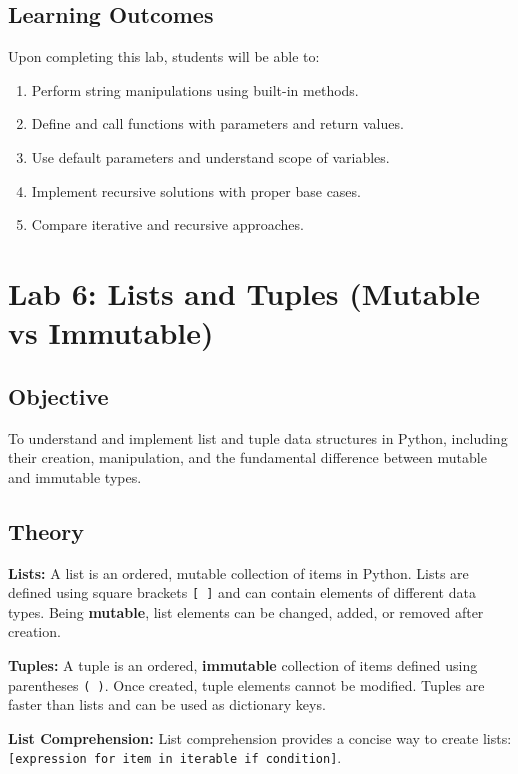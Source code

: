 \documentclass[12pt,a4paper]{article}
\begin{document}
\subsection{Learning Outcomes}
Upon completing this lab, students will be able to:
\begin{enumerate}
  \item Perform string manipulations using built-in methods.
  \item Define and call functions with parameters and return values.
  \item Use default parameters and understand scope of variables.
  \item Implement recursive solutions with proper base cases.
  \item Compare iterative and recursive approaches.
\end{enumerate}

\newpage

\section{Lab 6: Lists and Tuples (Mutable vs Immutable)}

\subsection{Objective}
To understand and implement list and tuple data structures in Python, including their creation, manipulation, and the fundamental difference between mutable and immutable types.

\subsection{Theory}

\textbf{Lists:}
A list is an ordered, mutable collection of items in Python. Lists are defined using square brackets \texttt{[ ]} and can contain elements of different data types. Being \textbf{mutable}, list elements can be changed, added, or removed after creation.

\textbf{Tuples:}
A tuple is an ordered, \textbf{immutable} collection of items defined using parentheses \texttt{( )}. Once created, tuple elements cannot be modified. Tuples are faster than lists and can be used as dictionary keys.

\textbf{List Comprehension:}
List comprehension provides a concise way to create lists: \texttt{[expression for item in iterable if condition]}.
\end{document}
